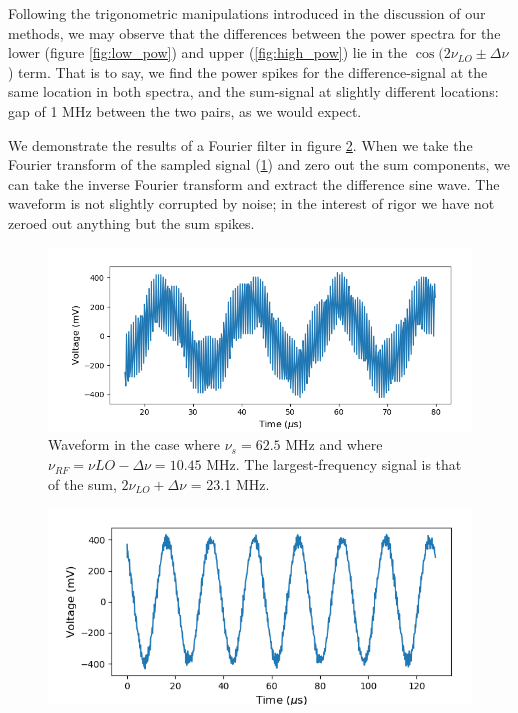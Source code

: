 \documentclass[a4paper]{article}
\begin{document}
Following the trigonometric manipulations introduced in the discussion of our methods, we may observe that the differences between the power spectra for the lower (figure \ref{fig:low_pow}) and upper (\ref{fig:high_pow}) lie in the $\cos(2\nu_{LO} \pm \Delta \nu$) term. That is to say, we find the power spikes for the difference-signal at the same location in both spectra, and the sum-signal at slightly different locations: gap of 1 MHz between the two pairs, as we would expect.

We demonstrate the results of a Fourier filter in figure \ref{fig:filtered}. When we take the Fourier transform of the sampled signal (\ref{fig:low_display}) and zero out the sum components, we can take the inverse Fourier transform and extract the difference sine wave. The waveform is not slightly corrupted by noise; in the interest of rigor we have not zeroed out anything but the sum spikes.

\begin{figure}
\centering
\includegraphics[width=.8\linewidth]{7-1/low_osc}
\caption{Waveform in the case where $\nu_s = 62.5$ MHz and where $\nu_{RF} = \nu{LO} - \Delta \nu = 10.45$ MHz. The largest-frequency signal is that of the sum, $2 \nu_{LO} + \Delta \nu$ = 23.1 MHz.}
\label{fig:low_display}
\end{figure}

\begin{figure}
\centering
\includegraphics[width=.7\linewidth]{7-1/filtered}
\caption{}
\label{fig:filtered}
\end{figure}

\end{document}
